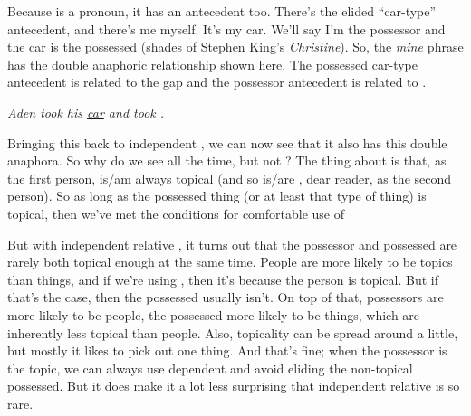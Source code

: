 \bigskip

Because  is a pronoun, it has an antecedent too. There's the elided \enquote{car-type} antecedent, and there's me myself. It's my car. We'll say I'm the possessor and the car is the possessed (shades of Stephen King's \textit{Christine}). So, the \textit{mine \uline{\phantom{car}}} phrase has the double anaphoric relationship shown here. The possessed car-type antecedent is related to the gap and the possessor antecedent  is related to .

\bigskip

\ea \textit{Aden took his \uline{car} and  took  \uline{\phantom{car}}.}\\
    \label{ex:Aden3}
\z

Bringing this back to independent , we can now see that it also has this double anaphora. So why do we see  all the time, but not ? The thing about  is that, as the first person,  is/am always topical (and so is/are , dear reader, as the second person). So as long as the possessed thing (or at least that type of thing) is topical, then we've met the conditions for comfortable use of 

But with independent relative , it turns out that the possessor and possessed are rarely both topical enough at the same time. People are more likely to be topics than things, and if we're using , then it's because the person is topical. But if that's the case, then the possessed usually isn't. On top of that, possessors are more likely to be people, the possessed more likely to be things, which are inherently less topical than people. Also, topicality can be spread around a little, but mostly it likes to pick out one thing. And that's fine; when the possessor is the topic, we can always use dependent  and avoid eliding the non-topical possessed. But it does make it a lot less surprising that independent relative  is so rare.

